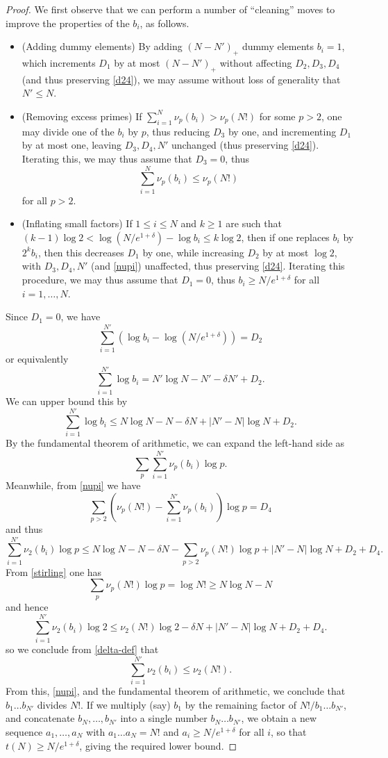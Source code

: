 \documentclass[12pt,a4paper,reqno]{amsart}
\numberwithin{equation}{section}
\theoremstyle{plain}
\theoremstyle{definition}
\begin{document}
\begin{proof}
  We first observe that we can perform a number of ``cleaning'' moves to improve the properties of the $b_i$, as follows.

  \begin{itemize}
  \item (Adding dummy elements) By adding $(N-N')_+$ dummy elements $b_i=1$, which increments $D_1$ by at most $(N-N')_+$ without affecting $D_2,D_3,D_4$ (and thus preserving \eqref{d24}), we may assume without loss of generality that $N' \leq N$.
  \item (Removing excess primes) If $\sum_{i=1}^{N} \nu_p(b_i) > \nu_p(N!)$ for some $p>2$, one may divide one of the $b_i$ by $p$, thus reducing $D_3$ by one, and incrementing $D_1$ by at most one, leaving $D_3,D_4,N'$ unchanged (thus preserving \eqref{d24}).  Iterating this, we may thus assume that $D_3=0$, thus
  \begin{equation}\label{nupi}
    \sum_{i=1}^{N} \nu_p(b_i) \leq \nu_p(N!)
   \end{equation}
     for all $p>2$.
  \item (Inflating small factors) If $1 \leq i \leq N$ and $k \geq 1$ are such that $(k-1) \log 2 < \log (N/e^{1+\delta})- \log b_i \leq k \log 2$, then if one replaces $b_i$ by $2^k b_i$, then this decreases $D_1$ by one, while increasing $D_2$ by at most $\log 2$, with $D_3,D_4,N'$ (and \eqref{nupi}) unaffected, thus preserving \eqref{d24}.  Iterating this procedure, we may thus assume that $D_1=0$, thus $b_i \geq N/e^{1+\delta}$ for all $i=1,\dots,N$.
  \end{itemize}

Since $D_1=0$, we have
  $$ \sum_{i=1}^{N'} (\log b_i - \log (N/e^{1+\delta})) = D_2$$
  or equivalently
  $$ \sum_{i=1}^{N'} \log b_i = N' \log N - N' - \delta N' + D_2.$$
  We can upper bound this by
  $$ \sum_{i=1}^{N'} \log b_i \leq N \log N - N - \delta N + |N'-N| \log N + D_2.$$
  By the fundamental theorem of arithmetic, we can expand the left-hand side as
  $$ \sum_p \sum_{i=1}^{N'} \nu_p(b_i) \log p.$$
  Meanwhile, from \eqref{nupi} we have
  $$\sum_{p>2} \left(\nu_p(N!) - \sum_{i=1}^{N'} \nu_p(b_i)\right) \log p = D_4$$
  and thus
  $$ \sum_{i=1}^{N'} \nu_2(b_i) \log p
  \leq N \log N - N - \delta N - \sum_{p>2} \nu_p(N!) \log p + |N'-N|  \log N + D_2 + D_4.$$
  From \eqref{stirling} one has
  $$ \sum_p \nu_p(N!) \log p = \log N! \geq N \log N - N$$
  and hence
  $$ \sum_{i=1}^{N'} \nu_2(b_i) \log 2 \leq \nu_2(N!) \log 2 - \delta N + |N'-N| \log N + D_2 + D_4.$$
  so we conclude from \eqref{delta-def} that
  $$ \sum_{i=1}^{N'} \nu_2(b_i) \leq \nu_2(N!).$$
  From this, \eqref{nupi}, and the fundamental theorem of arithmetic, we conclude that $b_1 \dots b_{N'}$ divides $N!$.  If we multiply (say) $b_1$ by the remaining factor of $N! / b_1 \dots b_{N'}$, and concatenate $b_{N},\dots,b_{N'}$ into a single number $b_{N} \dots b_{N'}$, we obtain a new sequence $a_1,\dots,a_N$ with $a_1 \dots a_N = N!$ and $a_i \geq N/e^{1+\delta}$ for all $i$, so that $t(N) \geq N / e^{1+\delta}$, giving the required lower bound.
\end{proof}
\end{document}
